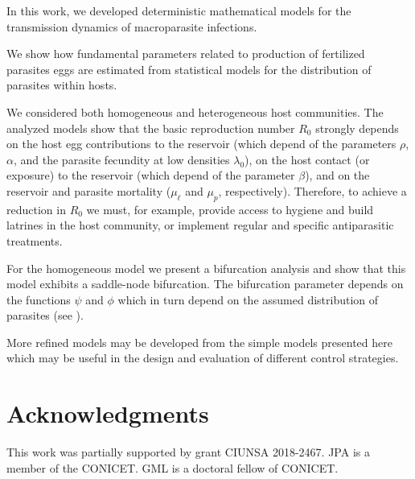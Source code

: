 \documentclass[eng]{MMSB-class-eng}
\begin{document}
{\color{red}

In this work, we developed deterministic mathematical models for the transmission dynamics of macroparasite infections. 

We show how fundamental parameters related to production of fertilized parasites eggs are estimated from statistical models for the distribution of
parasites within hosts.	

We considered both homogeneous and heterogeneous host communities. 
The analyzed models show that the basic reproduction number $R_0$ strongly depends on 
the host egg contributions to the reservoir (which depend of the parameters $\rho$, $\alpha$, and the parasite fecundity at low densities $\lambda_0 $), 
on the host contact (or exposure) to the reservoir (which depend of the parameter $\beta$),  
and on the reservoir and parasite mortality ($\mu_{\ell}$ and $\mu_p$, respectively). 
Therefore, to achieve a reduction in $R_0$ we must, for example, provide access to hygiene and build latrines in the host community, or implement regular and specific antiparasitic treatments.

For the homogeneous model we present a bifurcation analysis and show that this model exhibits a saddle-node bifurcation.
The bifurcation parameter depends on the functions $\psi$ and $\phi$ which in turn depend on the assumed
distribution of parasites (see \citet{lopez2022general}).

More refined models may be developed from the simple models presented here which may be useful in the design and evaluation of different control strategies. 

}
\section{Acknowledgments}
This work was partially supported by grant CIUNSA 2018-2467. JPA is a member of the CONICET. GML is a doctoral fellow of CONICET.


\end{document}
